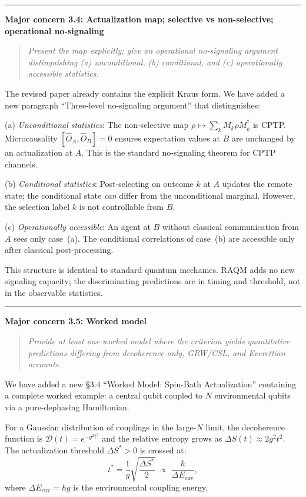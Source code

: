 \documentclass[11pt]{article}
\newcommand{\refereequote}[1]{%
  \begin{quote}\itshape\small #1\end{quote}}
\begin{document}
\bigskip\hrule\bigskip

\noindent\textbf{Major concern 3.4: Actualization map; selective vs
non-selective; operational no-signaling}

\refereequote{Present the map explicitly; give an operational no-signaling
argument distinguishing (a) unconditional, (b) conditional, and (c) operationally
accessible statistics.}

The revised paper already contains the explicit Kraus form. We have added
a new paragraph ``Three-level no-signaling argument'' that distinguishes:

(a) \emph{Unconditional statistics}: The non-selective map
$\rho \mapsto \sum_k M_k\rho M_k^\dagger$ is CPTP. Microcausality
$[\hat{O}_A, \hat{O}_B] = 0$ ensures expectation values at $B$ are
unchanged by an actualization at $A$. This is the standard no-signaling
theorem for CPTP channels.

(b) \emph{Conditional statistics}: Post-selecting on outcome $k$ at $A$
updates the remote state; the conditional state \emph{can} differ from
the unconditional marginal. However, the selection label $k$ is not
controllable from $B$.

(c) \emph{Operationally accessible}: An agent at $B$ without classical
communication from $A$ sees only case~(a). The conditional correlations
of case~(b) are accessible only after classical post-processing.

This structure is identical to standard quantum mechanics. RAQM adds no
new signaling capacity; the discriminating predictions are in timing and
threshold, not in the observable statistics.

\bigskip\hrule\bigskip

\noindent\textbf{Major concern 3.5: Worked model}

\refereequote{Provide at least one worked model where the criterion yields
quantitative predictions differing from decoherence-only, GRW/CSL,
and Everettian accounts.}

We have added a new \S3.4 ``Worked Model: Spin-Bath Actualization'' containing
a complete worked example: a central qubit coupled to $N$ environmental qubits
via a pure-dephasing Hamiltonian.

For a Gaussian distribution of couplings in the large-$N$ limit, the
decoherence function is $\mathcal{D}(t) = e^{-g^2t^2}$ and the relative
entropy grows as $\Delta S(t) \approx 2g^2t^2$. The actualization threshold
$\Delta S^* > 0$ is crossed at:
\[
  t^* = \frac{1}{g}\sqrt{\frac{\Delta S^*}{2}}
  \;\propto\; \frac{\hbar}{\Delta E_{\mathrm{env}}},
\]
where $\Delta E_{\mathrm{env}} = \hbar g$ is the environmental coupling energy.
\end{document}
